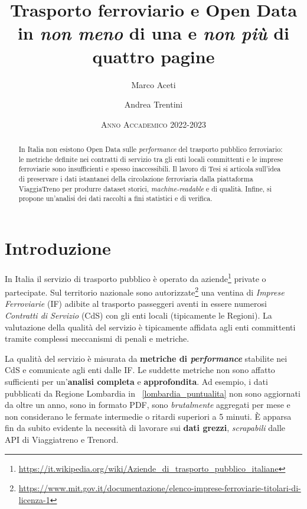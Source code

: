 \documentclass[italian]{article}
\title{Trasporto ferroviario e Open Data\\\small{in \textit{non meno}
        di una e \textit{non più} di quattro pagine}}
\date{\textsc{Anno Accademico 2022-2023}}
\author[1]{Marco Aceti}
\author[2]{Andrea Trentini}
\affil[1]{\small{Laureando, matr.\@ 963032}}
\affil[2]{\small{Relatore}}
\begin{document}
\maketitle

\begin{abstract}
    In Italia non esistono Open Data sulle \textit{performance} del
    trasporto pubblico ferroviario: le metriche definite nei contratti
    di servizio tra gli enti locali committenti e le imprese
    ferroviarie sono insufficienti e spesso inaccessibili.  Il lavoro
    di Tesi si articola sull'idea di preservare i dati istantanei
    della circolazione ferroviaria dalla piattaforma ViaggiaTreno per
    produrre dataset storici, \textit{machine-readable} e di qualità.
    Infine, si propone un'analisi dei dati raccolti a fini statistici
    e di verifica.
\end{abstract}

\section{Introduzione}

In Italia il servizio di trasporto pubblico è operato da
aziende\footnote{\url{https://it.wikipedia.org/wiki/Aziende_di_trasporto_pubblico_italiane}}
private o partecipate.  Sul territorio nazionale sono
autorizzate\footnote{\url{https://www.mit.gov.it/documentazione/elenco-imprese-ferroviarie-titolari-di-licenza-1}}
una ventina di \textit{Imprese Ferroviarie} (IF) adibite al trasporto
passeggeri aventi in essere numerosi \textit{Contratti di Servizio}
(CdS) con gli enti locali (tipicamente le Regioni).  La valutazione
della qualità del servizio è tipicamente affidata agli enti
committenti tramite complessi meccanismi di penali e metriche.

La qualità del servizio è misurata da \textbf{metriche di
    \textit{performance}} stabilite nei CdS e comunicate agli enti
dalle IF\@.  Le suddette metriche non sono affatto sufficienti per
un'\textbf{analisi completa} e \textbf{approfondita}.  Ad esempio, i
dati pubblicati da Regione Lombardia in
\figurename~\ref{lombardia_puntualita} non sono aggiornati da oltre un
anno, sono in formato PDF, sono \textit{brutalmente} aggregati per
mese e non considerano le fermate intermedie o ritardi superiori a 5
minuti.  È apparsa fin da subito evidente la necessità di lavorare sui
\textbf{dati grezzi}, \textit{scrapabili} dalle API di Viaggiatreno e
Trenord.
\end{document}
